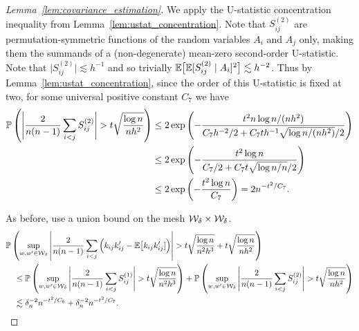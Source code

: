 \begin{proof}[Lemma~\ref{lem:covariance_estimation}]

  We apply the U-statistic concentration inequality from
  Lemma~\ref{lem:ustat_concentration}.
  Note that $S_{ij}^{(2)}$
  are permutation-symmetric functions of
  the random variables
  $A_i$ and $A_j$ only,
  making them the summands of
  a (non-degenerate) mean-zero second-order U-statistic.
  Note that
  $\big|S_{ij}^{(2)}\big| \lesssim h^{-1}$
  and so trivially
  $\E\big[\E[S_{ij}^{(2)} \mid A_i ]^2 \big] \lesssim h^{-2}$.
  Thus by Lemma~\ref{lem:ustat_concentration},
  since the order of this U-statistic is fixed at two,
  for some universal positive constant $C_7$ we have
  \begin{align*}
    \P\left(
      \Bigg|
      \frac{2}{n(n-1)}
      \sum_{i<j}
      S_{ij}^{(2)}
      \Bigg|
      > t
      \sqrt{\frac{\log n}{nh^2}}
    \right)
    &\leq
    2 \exp\left(
      - \frac{t^2 n \log n / (nh^2)}
      {C_7 h^{-2} / 2 + C_7 t h^{-1} \sqrt{\log n / (nh^2)} / 2}
    \right) \\
    &\leq
    2 \exp\left(
      - \frac{t^2 \log n}
      {C_7 / 2 + C_7 t \sqrt{\log n / n} / 2}
    \right) \\
    &\leq
    2 \exp\left(
      - \frac{t^2 \log n}{C_7}
    \right)
    =
    2 n^{-t^2 / C_7}.
  \end{align*}


  As before, use a union bound
  on the mesh $\cW_\delta \times \cW_\delta$.
  \begin{align*}
    &\P\left(
      \sup_{w,w' \in \cW_\delta}
      \left|
      \frac{2}{n(n-1)}
      \sum_{i<j}
      \Big(
      k_{ij} k_{ij}'
      - \E\big[k_{ij} k_{ij}']
      \Big)
      \right|
      > t \sqrt{\frac{\log n}{n^2h^3}}
      + t \sqrt{\frac{\log n}{nh^2}}
    \right) \\
    &\quad\leq
    \P\left(
      \sup_{w,w' \in \cW_\delta}
      \Bigg|
      \frac{2}{n(n-1)}
      \sum_{i<j}
      S_{ij}^{(1)}
      \Bigg|
      > t
      \sqrt{\frac{\log n}{n^2h^3}}
    \right)
    + \P\left(
      \sup_{w,w' \in \cW_\delta}
      \Bigg|
      \frac{2}{n(n-1)}
      \sum_{i<j}
      S_{ij}^{(2)}
      \Bigg|
      > t
      \sqrt{\frac{\log n}{nh^2}}
    \right) \\
    &\quad\lesssim
    \delta_n^{-2} n^{-t^2 / C_6}
    + \delta_n^{-2} n^{-t^2 / C_7}.
  \end{align*}


\end{proof}
